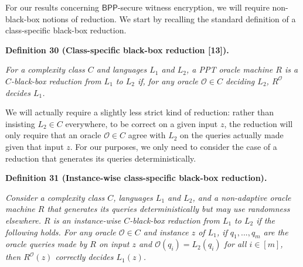 \documentclass[10pt,a4paper]{article}
\begin{document}



For our results concerning ${\mathsf{BPP}}$-secure witness encryption, we will require non-black-box notions of reduction. We start by recalling the standard definition of a class-specific black-box reduction.\par





\par\medskip\noindent\textbf{
\textbf{Definition 30}\textbf{ }(Class-specific black-box reduction [13])\textbf{.}
}\par



\emph{For a complexity class $C$ and languages $L_{1}$ and $L_{2}$, a PPT oracle machine $R$ is a $C$-black-box reduction from $L_{1}$ to $L_{2}$ if, for any oracle $\mathcal{O}\in C$ deciding $L_{2}$, $R^{\mathcal{O}}$ decides $L_{1}$.}\par






We will actually require a slightly less strict kind of reduction: rather than insisting $L_{2}\in C$ everywhere, to be correct on a given input $z$, the reduction will only require that an oracle $\mathcal{O}\in C$ agree with $L_{2}$ on the queries actually made given that input $z$. For our purposes, we only need to consider the case of a reduction that generates its queries deterministically.\par





\par\medskip\noindent\textbf{
\textbf{Definition 31}\textbf{ }(Instance-wise class-specific black-box reduction)\textbf{.}
}\par



\emph{Consider a complexity class $C$, languages $L_{1}$ and $L_{2}$, and a non-adaptive oracle machine $R$ that generates its queries deterministically but may use randomness elsewhere. $R$ is an instance-wise $C$-black-box reduction from $L_{1}$ to $L_{2}$ if the following holds. For any oracle $\mathcal{O}\in C$ and instance $z$ of $L_{1}$, if $q_{1},...,q_{m}$ are the oracle queries made by $R$ on input $z$ and $\mathcal{O}(q_{i})=L_{2}(q_{i})$ for all $i\in[m]$, then $R^{\mathcal{O}}(z)$ correctly decides $L_{1}(z)$.}\par
\end{document}
